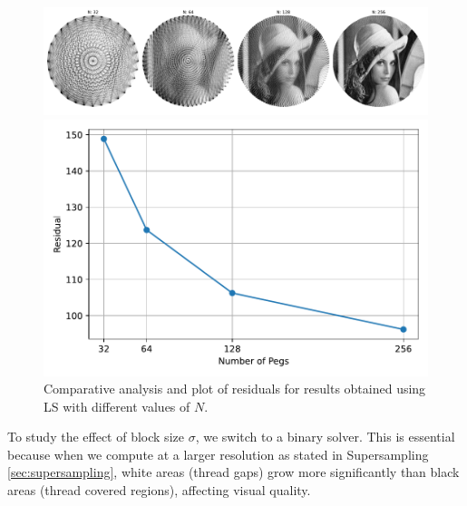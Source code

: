 \begin{figure}[H]
    \centering
    \begin{minipage}{0.75\linewidth}
        \centering
        \includegraphics[width=\linewidth]{images/tuning/ls_images.pdf}
    \end{minipage}%
    \hfill
    \begin{minipage}{0.23\linewidth}
        \centering
        \includegraphics[width=\linewidth]{images/tuning/ls_residuals.pdf}
    \end{minipage}
    \caption{Comparative analysis and plot of residuals for results obtained using LS with different values of \(N\).}
    \label{fig:ls_n_tuning}
\end{figure}

To study the effect of block size \(\sigma\), we switch to a binary solver. This is essential because when we compute at a larger resolution as stated in Supersampling \ref{sec:supersampling}, white areas (thread gaps) grow more significantly than black areas (thread covered regions), affecting visual quality.

